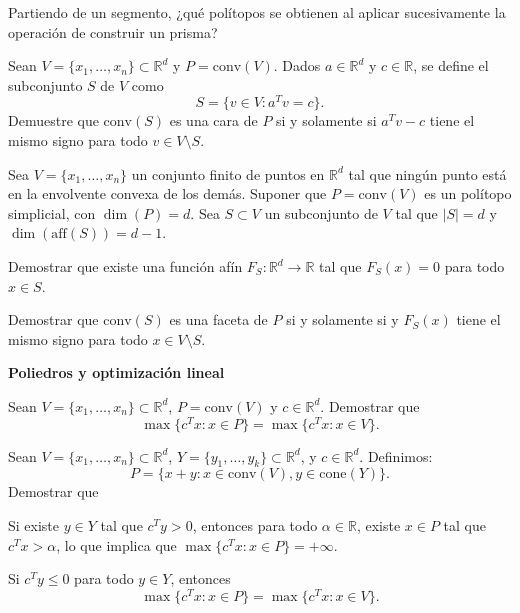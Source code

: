 \documentclass[a4paper,12pt]{article}
\renewcommand{\conv}[1]{\mathrm{conv}(#1)}
\renewcommand{\cone}[1]{\mathrm{cone}(#1)}
\begin{document}
\begin{exerciselist}
\item Partiendo de un segmento, ¿qué polítopos se obtienen al aplicar sucesivamente la operación de construir un prisma?
\item Sean $V = \{ x_1, \ldots, x_n \} \subset \mathbb{R}^d$ y $P=\conv{V}$. Dados $a \in \mathbb{R}^d$ y $c \in \mathbb{R}$, se define el subconjunto $S$ de $V$ como
\[
S = \{ v \in V : a^T v = c \}.
\]
Demuestre que $\conv{S}$ es una cara de $P$ si y solamente si $a^T v - c$ tiene el mismo signo para todo $v \in V\setminus S$.
\item Sea $V = \{ x_1, \ldots, x_n \}$ un conjunto finito de puntos en $\mathbb{R}^d$ tal que ningún punto está en la envolvente convexa de los demás. Suponer que $P=\conv{V}$ es un polítopo simplicial, con $\dim(P)=d$. Sea $S \subset V$ un subconjunto de $V$ tal que $|S|=d$ y $\dim(\text{aff}(S))=d-1$.
\begin{exerciselist}
\item Demostrar que existe una función afín $F_S : \mathbb{R}^d \to \mathbb{R}$ tal que $F_S(x)=0$ para todo $x \in S$.
\item Demostrar que $\conv{S}$ es una faceta de $P$ si y solamente si y $F_S(x)$ tiene el mismo signo para todo $x \in V\setminus S$.
\end{exerciselist}
\end{exerciselist}

\noindent\textbf{Poliedros y optimización lineal}
\begin{exerciselist}
\item Sean $V= \{ x_1, \ldots, x_n \} \subset \mathbb{R}^d$, $P=\conv{V}$ y $c \in \mathbb{R}^d$. Demostrar que
$$
\max \{ c^T x : x \in P \} = \max \{ c^T x : x \in V \}.
$$
\item Sean $V= \{ x_1, \ldots, x_n \} \subset \mathbb{R}^d$, $Y= \{ y_1, \ldots, y_k \} \subset \mathbb{R}^d$, y $c \in \mathbb{R}^d$. Definimos:
$$
P = \{ x + y : x \in \conv{V}, y \in \cone{Y} \}.
$$
Demostrar que
\begin{exerciselist}
\item Si existe $y \in Y$ tal que $c^T y > 0$, entonces para todo $\alpha \in \mathbb{R}$, existe $x \in P$ tal que $c^T x > \alpha$, lo que implica que $\max \{ c^T x : x \in P \} = +\infty$.
\item Si $c^T y \leq 0$ para todo $y \in Y$, entonces
$$
\max \{ c^T x : x \in P \} = \max \{ c^T x : x \in V\}.
$$
\end{exerciselist}
\end{exerciselist}
\end{document}
